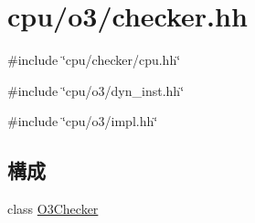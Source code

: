 \hypertarget{checker_8hh}{
\section{cpu/o3/checker.hh}
\label{checker_8hh}
}
{\ttfamily \#include \char`\"{}cpu/checker/cpu.hh\char`\"{}}\par
{\ttfamily \#include \char`\"{}cpu/o3/dyn\_\-inst.hh\char`\"{}}\par
{\ttfamily \#include \char`\"{}cpu/o3/impl.hh\char`\"{}}\par
\subsection*{構成}
\begin{DoxyCompactItemize}
\item 
class \hyperlink{classO3Checker}{O3Checker}
\end{DoxyCompactItemize}
